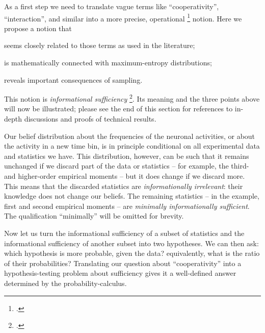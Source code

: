 \documentclass[\ifafour a4paper,12pt,\else a5paper,10pt,\fi%
onecolumn,oneside,article,%
british%
]{memoir}
\theoremstyle{remark}
\theoremstyle{innote}
\newcommand*{\citep}{\footcites}
\renewcommand*{\|}{\nonscript\,\vert\nonscript\;\mathopen{}}
\newcommand*{\sect}{\S}%
\newcommand*{\chap}{ch.}%
\begin{document}
\bigskip

As a first step we need to translate vague terms like
\enquote{cooperativity}, \enquote{interaction}, and similar into a more
precise, operational \citep{bridgman1927_r1958} notion. Here we propose a
notion that
\begin{enumerate*}[label=(\roman*)]
\item seems closely related to those terms as used in the
  literature; \item is mathematically connected with maximum-entropy
  distributions; \item reveals important consequences of sampling.
\end{enumerate*}
This notion is \emph{informational sufficiency}
\citep{kullbacketal1951}[\sect~4.5]{bernardoetal1994}[\chap~8 and
\sect~14.2]{jaynes1994_r2003}. Its meaning and the three points above will
now be illustrated; please see the end of this section for references to
in-depth discussions and proofs of technical results.

Our belief distribution about the frequencies of the neuronal activities,
or about the activity in a new time bin, is in principle conditional on all
experimental data and statistics we have. This distribution, however, can
be such that it remains unchanged if we discard part of the data or
statistics -- for example, the third- and higher-order empirical moments --
but it does change if we discard more. This means that the discarded
statistics are \emph{informationally irrelevant}: their knowledge does not
change our beliefs. The remaining statistics -- in the example, first and
second empirical moments -- are \emph{minimally informationally
  sufficient}. The qualification \enquote{minimally} will be omitted for
brevity.

Now let us turn the informational sufficiency of a subset of statistics and
the informational sufficiency of another subset into two hypotheses. We can
then ask: which hypothesis is more probable, given the data? equivalently,
what is the ratio of their probabilities? Translating our question about
\enquote{cooperativity} into a hypothesis-testing problem about sufficiency
gives it a well-defined answer determined by the
probability-calculus. %
\end{document}
